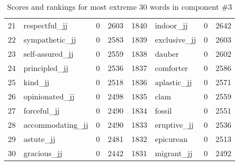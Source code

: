 \begin{table}[tbp]
\begin{tabular}{| rlr@{.}l | rlr@{.}l |}
    21 & respectful\_jj & 0 & 2603    &    1840 & indoor\_jj & 0 & 2642 \\
    22 & sympathetic\_jj & 0 & 2583    &    1839 & exclusive\_jj & 0 & 2603 \\
    23 & self-assured\_jj & 0 & 2559    &    1838 & dauber & 0 & 2602 \\
    24 & principled\_jj & 0 & 2536    &    1837 & comforter & 0 & 2586 \\
    25 & kind\_jj & 0 & 2518    &    1836 & aplastic\_jj & 0 & 2571 \\
    26 & opinionated\_jj & 0 & 2498    &    1835 & clam & 0 & 2559 \\
    27 & forceful\_jj & 0 & 2490    &    1834 & fossil & 0 & 2551 \\
    28 & accommodating\_jj & 0 & 2490    &    1833 & eruptive\_jj & 0 & 2536 \\
    29 & astute\_jj & 0 & 2481    &    1832 & epicurean & 0 & 2513 \\
    30 & gracious\_jj & 0 & 2442    &    1831 & migrant\_jj & 0 & 2492 \\
    \hline
    \end{tabular}
    \caption{Scores and rankings for most extreme 30 words in component \#3} 
\end{table}
\clearpage
